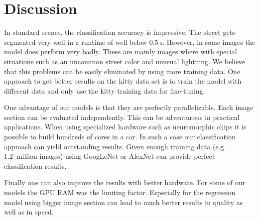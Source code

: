 
\section{Discussion}\label{sec:discussion}

In standard scenes, the classification accuracy is impressive. The street gets
segmented very well in a runtime of well below  $\SI{0.5}{\second}$. However,
in some images the model does perform very badly. These are mainly images where
with special situations such as an uncommon street color and unusual
lightning. We believe that this problems can be easily eliminated by using more
training data. One approach to get better results on the kitty data set is to
train the model with different data and only use the kitty training data for
fine-tuning.

One advantage of our models is that they are perfectly parallelizable. Each
image section can be evaluated independently. This can be adventurous in
practical applications. When using specialized hardware such as neuromorphic
chips it is possible to build hundreds of cores in a car. In such a case our
classification approach can yield outstanding results. Given enough training
data (e.g. 1.2~million images) using GoogLeNet or AlexNet can provide perfect
classification results.

Finally one can also improve the results with better hardware. For some of our
models the \gls{GPU} RAM was the limiting factor. Especially for the regression
model using bigger image section can lead to much better results in quality as
well as in speed.

